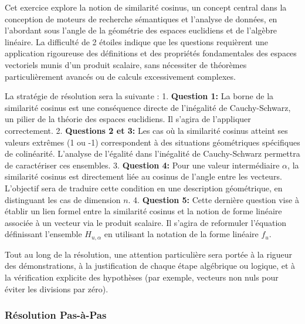 \documentclass[11pt,a4paper]{report}
\begin{document}
Cet exercice explore la notion de similarité cosinus, un concept central
dans la conception de moteurs de recherche sémantiques et l'analyse de
données, en l'abordant sous l'angle de la géométrie des espaces
euclidiens et de l'algèbre linéaire. La difficulté de 2 étoiles indique
que les questions requièrent une application rigoureuse des définitions
et des propriétés fondamentales des espaces vectoriels munis d'un
produit scalaire, sans nécessiter de théorèmes particulièrement avancés
ou de calculs excessivement complexes.

La stratégie de résolution sera la suivante : 1. \textbf{Question 1:} La
borne de la similarité cosinus est une conséquence directe de
l'inégalité de Cauchy-Schwarz, un pilier de la théorie des espaces
euclidiens. Il s'agira de l'appliquer correctement. 2. \textbf{Questions
2 et 3:} Les cas où la similarité cosinus atteint ses valeurs extrêmes
(1 ou -1) correspondent à des situations géométriques spécifiques de
colinéarité. L'analyse de l'égalité dans l'inégalité de Cauchy-Schwarz
permettra de caractériser ces ensembles. 3. \textbf{Question 4:} Pour
une valeur intermédiaire \(\alpha\), la similarité cosinus est
directement liée au cosinus de l'angle entre les vecteurs. L'objectif
sera de traduire cette condition en une description géométrique, en
distinguant les cas de dimension \(n\). 4. \textbf{Question 5:} Cette
dernière question vise à établir un lien formel entre la similarité
cosinus et la notion de forme linéaire associée à un vecteur via le
produit scalaire. Il s'agira de reformuler l'équation définissant
l'ensemble \(H_{u, \alpha}\) en utilisant la notation de la forme
linéaire \(f_u\).

Tout au long de la résolution, une attention particulière sera portée à
la rigueur des démonstrations, à la justification de chaque étape
algébrique ou logique, et à la vérification explicite des hypothèses
(par exemple, vecteurs non nuls pour éviter les divisions par zéro).

\hypertarget{ruxe9solution-pas-uxe0-pas}{%
\subsubsection{Résolution Pas-à-Pas}\label{ruxe9solution-pas-uxe0-pas}}
\end{document}
